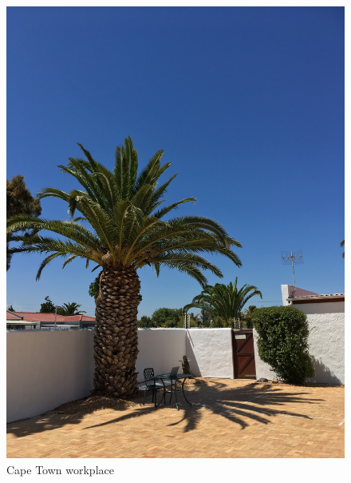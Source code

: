 \begin{figure}
\centering
\includegraphics[width=\linewidth,angle=270]{capetown.JPG}
\caption{Cape Town workplace}
\label{fig-capetown}
\end{figure}


